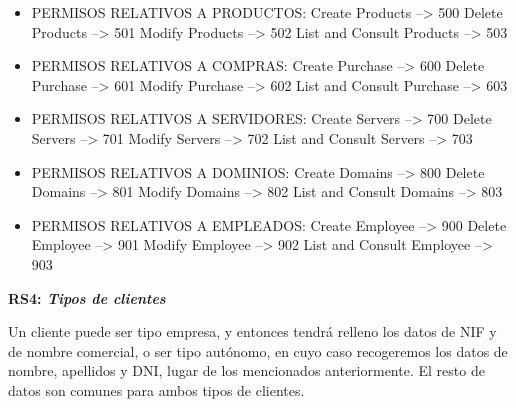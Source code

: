 \documentclass[paper=a4, fontsize=11pt, spanish]{scrartcl}
\begin{document}
\begin{itemize}
\item PERMISOS RELATIVOS A PRODUCTOS:
\newline    Create Products           --> 500
\newline    Delete Products           --> 501
\newline    Modify Products           --> 502
\newline    List and Consult Products --> 503

\item PERMISOS RELATIVOS A COMPRAS:
\newline    Create Purchase             --> 600
\newline    Delete Purchase             --> 601
\newline    Modify Purchase             --> 602
\newline    List and Consult Purchase   --> 603

\item PERMISOS RELATIVOS A SERVIDORES:
\newline    Create Servers            --> 700
\newline    Delete Servers            --> 701
\newline    Modify Servers            --> 702
\newline    List and Consult Servers  --> 703

\item PERMISOS RELATIVOS A DOMINIOS:
\newline    Create Domains            --> 800
\newline    Delete Domains            --> 801
\newline    Modify Domains            --> 802
\newline    List and Consult Domains  --> 803

\item PERMISOS RELATIVOS A EMPLEADOS:
\newline    Create Employee            --> 900
\newline    Delete Employee            --> 901
\newline    Modify Employee            --> 902
\newline    List and Consult Employee  --> 903
    
\end{itemize}

\setlength{\parindent}{0em}
\textbf{RS4: \textit{Tipos de clientes}}
\setlength{\parindent}{2em}

Un cliente puede ser tipo empresa, y entonces tendrá relleno los datos de NIF y de nombre comercial, o ser tipo autónomo, en cuyo caso recogeremos los datos de nombre, apellidos y DNI, lugar de los mencionados anteriormente. El resto de datos son comunes para ambos tipos de clientes.
\end{document}

